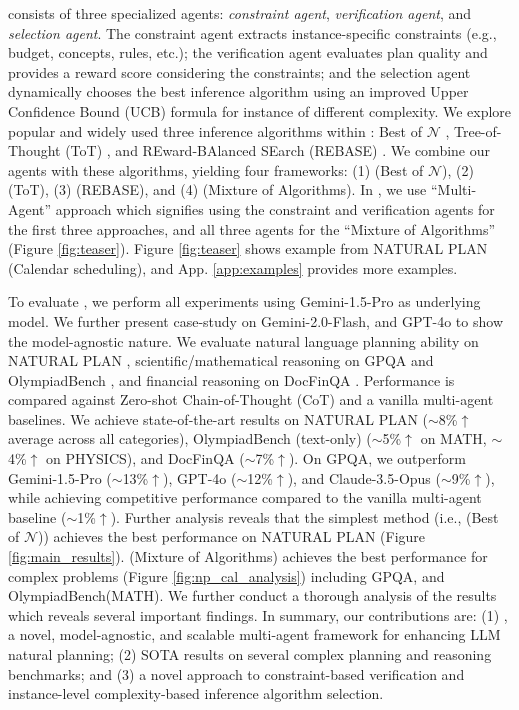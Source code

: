 \plangen{} consists of three specialized agents: \textit{constraint agent}, \textit{verification agent}, and \textit{selection agent}. The constraint agent extracts instance-specific constraints (e.g., budget, concepts, rules, etc.); the verification agent evaluates plan quality and provides a reward score considering the constraints; and the selection agent dynamically chooses the best inference algorithm using an improved Upper Confidence Bound (UCB) formula \citep{han2024ucb} for instance of different complexity. We explore popular and widely used three inference algorithms within \plangen{}: Best of $\mathcal{N}$ \citep{brown2024large}, Tree-of-Thought (ToT) \citep{yao2024tree}, and REward-BAlanced SEarch (REBASE) \citep{wu2024empirical}. We combine our agents with these algorithms, yielding four frameworks: (1) \plangen{} (Best of $\mathcal{N}$), (2) \plangen{} (ToT), (3) \plangen{} (REBASE), and (4) \plangen{} (Mixture of Algorithms).  In \plangen{}, we use ``Multi-Agent'' approach which signifies using the constraint and verification agents for the first three approaches, and all three agents for the ``Mixture of Algorithms'' (Figure \ref{fig:teaser}). Figure \ref{fig:teaser} shows example from NATURAL PLAN (Calendar scheduling), and App. \ref{app:examples} provides more examples.

To evaluate \plangen{}, we perform all experiments using Gemini-1.5-Pro \citep{team2024gemini} as underlying model. We further present case-study on Gemini-2.0-Flash, and GPT-4o \citep{hurst2024gpt} to show the model-agnostic nature. We evaluate natural language planning ability on NATURAL PLAN \citep{zheng2024natural}, scientific/mathematical reasoning on GPQA \citep{rein2024gpqa} and OlympiadBench \citep{he-etal-2024-olympiadbench}, and financial reasoning on DocFinQA \citep{reddy-etal-2024-docfinqa}. Performance is compared against Zero-shot Chain-of-Thought (CoT) and a vanilla multi-agent baselines. We achieve state-of-the-art results on NATURAL PLAN ($\sim$8\%$\uparrow$ average across all categories), OlympiadBench (text-only) ($\sim$5\%$\uparrow$ on MATH, $\sim$4\%$\uparrow$ on PHYSICS), and DocFinQA ($\sim$7\%$\uparrow$). On GPQA, we outperform Gemini-1.5-Pro ($\sim$13\%$\uparrow$), GPT-4o ($\sim$12\%$\uparrow$), and Claude-3.5-Opus ($\sim$9\%$\uparrow$), while achieving competitive performance compared to the vanilla multi-agent baseline ($\sim$1\%$\uparrow$). Further analysis reveals that the simplest method (i.e., \plangen{} (Best of $\mathcal{N}$)) achieves the best performance on NATURAL PLAN (Figure \ref{fig:main_results}). \plangen{} (Mixture of Algorithms) achieves the best performance for complex problems (Figure \ref{fig:np_cal_analysis}) including GPQA, and OlympiadBench(MATH). We further conduct a thorough analysis of the results which reveals several important findings. In summary, our contributions are: (1) \plangen{}, a novel, model-agnostic, and scalable multi-agent framework for enhancing LLM natural planning; (2) SOTA results on several complex planning and reasoning benchmarks; and (3) a novel approach to constraint-based verification and instance-level complexity-based inference algorithm selection. 

